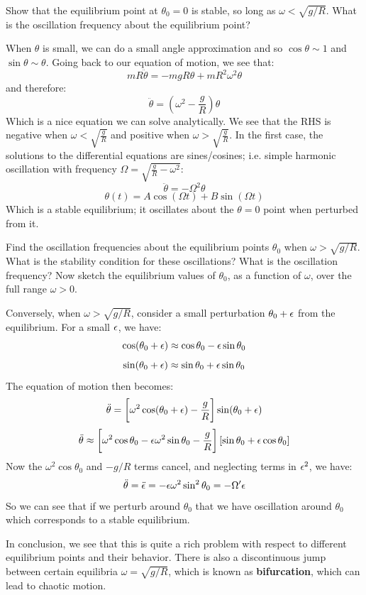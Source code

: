 \begin{p}
Show that the equilibrium point at $\theta_0 = 0$ is stable, so long as $\omega < \sqrt{g/R}$. What is the oscillation frequency about the equilibrium point?
\end{p}
\begin{s}
When $\theta$ is small, we can do a small angle approximation and so $\cos\theta \sim 1$ and $\sin\theta \sim \theta$. Going back to our equation of motion, we see that:
\[mR\ddot{\theta} = -mgR\theta + mR^2\omega^2\theta\]
and therefore:
\[\ddot{\theta} = \left(\omega^2 - \frac{g}{R}\right)\theta\]
Which is a nice equation we can solve analytically. We see that the RHS is negative when $\omega < \sqrt{\frac{g}{R}}$ and positive when $\omega > \sqrt{\frac{g}{R}}$. In the first case, the solutions to the differential equations are sines/cosines; i.e. simple harmonic oscillation with frequency $\Omega = \sqrt{\frac{g}{R} - \omega^2}$:
\[\ddot{\theta} = -\Omega^2\theta\]
\[\theta(t) = A\cos(\Omega t) + B\sin(\Omega t)\]
Which is a stable equilibrium; it oscillates about the $\theta = 0$ point when perturbed from it.
\end{s}

\begin{p}
Find the oscillation frequencies about the equilibrium points $\theta_0$ when $\omega > \sqrt{g/R}$. What is the stability condition for these oscillations? What is the oscillation frequency? Now sketch the equilibrium values of $\theta_0$, as a function of $\omega$, over the full range $\omega > 0$.
\end{p}
\begin{s}
Conversely, when $\omega > \sqrt{g/R}$, consider a small perturbation $\theta_0 + \epsilon$ from the equilibrium. For a small $\epsilon$, we have:
\[\cos(\theta_0 + \epsilon) \approx \cos\theta_0 - \epsilon\sin\theta_0\]
\[\sin(\theta_0 +\epsilon) \approx \sin\theta_0 +\epsilon\sin\theta_0\]
The equation of motion then becomes:
\[\ddot{\theta} = \left[\omega^2\cos(\theta_0 + \epsilon) - \frac{g}{R}\right]\sin(\theta_0 + \epsilon)\]
\[\ddot{\theta} \approx \left[\omega^2\cos\theta_0 - \epsilon\omega^2\sin\theta_0 - \frac{g}{R}\right]\left[\sin\theta_0 + \epsilon\cos\theta_0\right]\]
Now the $\omega^2\cos\theta_0$ and $-g/R$ terms cancel, and neglecting terms in $\epsilon^2$, we have:
\[\ddot{\theta} = \ddot{\epsilon} = -\epsilon\omega^2\sin^2\theta_0 = -\Omega'\epsilon\]
So we can see that if we perturb around $\theta_0$ that we have oscillation around $\theta_0$ which corresponds to a stable equilibrium. 
\end{s}
In conclusion, we see that this is quite a rich problem with respect to different equilibrium points and their behavior. There is also a discontinuous jump between certain equilibria $\omega = \sqrt{g/R}$, which is known as \textbf{bifurcation}, which can lead to chaotic motion.